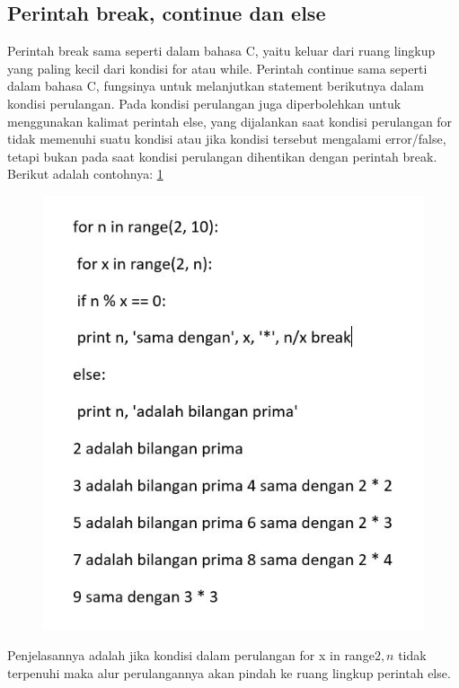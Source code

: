 \subsection{Perintah break, continue dan else}
 Perintah break sama seperti dalam bahasa C, yaitu keluar dari ruang lingkup yang paling kecil dari
kondisi for atau while.
Perintah continue sama  seperti dalam bahasa C, fungsinya untuk melanjutkan statement
berikutnya dalam kondisi perulangan.
Pada kondisi perulangan juga diperbolehkan untuk menggunakan kalimat perintah else, yang dijalankan saat kondisi perulangan for tidak memenuhi suatu kondisi atau jika kondisi tersebut mengalami error/false, tetapi bukan pada saat kondisi perulangan dihentikan dengan perintah break. Berikut adalah contohnya:
\ref{2_bce}

\begin{figure}[ht]
    \centerline{\includegraphics[width=1\textwidth]{figures/2_bce.JPG}}
    \caption{}
    \label{2_bce}
    \end{figure}

Penjelasannya adalah jika kondisi dalam perulangan for x in range\(2, n\) tidak terpenuhi maka alur perulangannya akan pindah ke ruang lingkup perintah else. 

